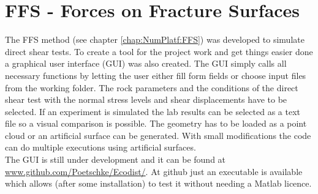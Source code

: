 \section{FFS - Forces on Fracture Surfaces}
The FFS method (see chapter \ref{chap:NumPlatf:FFS}) was developed to simulate direct shear tests. To create a tool for the project work and get things easier done a graphical user interface (GUI) was also created. The GUI simply calls all necessary functions by letting the user either fill form fields or choose input files from the working folder. The rock parameters and the conditions of the direct shear test with the normal stress levels and shear displacements have to be selected. If an experiment is simulated the lab results can be selected as a text file so a visual comparison is possible. The geometry has to be loaded as a point cloud or an artificial surface can be generated. With small modifications the code can do multiple executions using artificial surfaces.\\
The GUI is still under development and it can be found at \url{www.github.com/Poetschke/Ecodist/}. At github just an executable is available which allows (after some installation) to test it without needing a Matlab licence.\\

